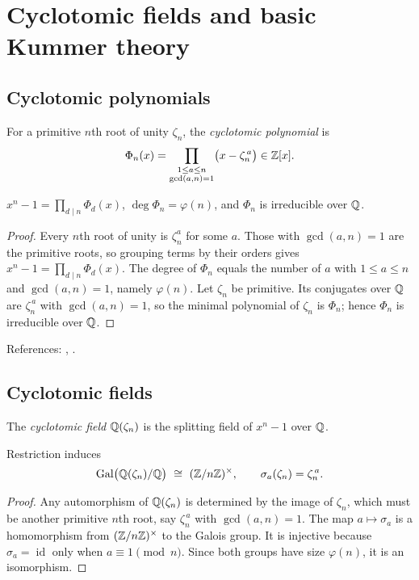 \section{Cyclotomic fields and basic Kummer theory}\label{sec:cyclotomic-kummer}

\subsection{Cyclotomic polynomials}
\begin{definition}
For a primitive $n$th root of unity $\zeta_n$, the \emph{cyclotomic polynomial} is
\[
\Phi_n(x)=\prod_{\substack{1\le a\le n\\ \gcd(a,n)=1}}\bigl(x-\zeta_n^{\,a}\bigr)\in\mathbb{Z}[x].
\]
\end{definition}
\begin{theorem}
$x^n-1=\prod_{d\mid n}\Phi_d(x)$, $\deg\Phi_n=\varphi(n)$, and $\Phi_n$ is irreducible over $\mathbb{Q}$.
\end{theorem}
\begin{proof}
Every $n$th root of unity is $\zeta_n^a$ for some $a$.
Those with $\gcd(a,n)=1$ are the primitive roots, so grouping terms by
their orders gives $x^n-1=\prod_{d\mid n}\Phi_d(x)$.
The degree of $\Phi_n$ equals the number of $a$ with $1\le a\le n$ and
$\gcd(a,n)=1$, namely $\varphi(n)$.
Let $\zeta_n$ be primitive.
Its conjugates over $\mathbb{Q}$ are $\zeta_n^{\,a}$ with $\gcd(a,n)=1$, so the
minimal polynomial of $\zeta_n$ is $\Phi_n$; hence $\Phi_n$ is
irreducible over $\mathbb{Q}$.
\end{proof}
References: \cite[\S13]{DF}, \cite[Ch.~VIII]{Lang}.

\subsection{Cyclotomic fields}
\begin{definition}
The \emph{cyclotomic field} $\mathbb{Q}(\zeta_n)$ is the splitting field of $x^n-1$ over $\mathbb{Q}$.
\end{definition}
\begin{theorem}
Restriction induces
\[
\Gal\bigl(\Q(\zeta_n)/\Q\bigr)\ \cong\ (\Z/n\Z)^\times,\qquad \sigma_a(\zeta_n)=\zeta_n^{\,a}.
\]
\end{theorem}
\begin{proof}
Any automorphism of $\mathbb{Q}(\zeta_n)$ is determined by the image of
$\zeta_n$, which must be another primitive $n$th root, say
$\zeta_n^{\,a}$ with $\gcd(a,n)=1$.
The map $a\mapsto\sigma_a$ is a homomorphism from
$(\mathbb{Z}/n\mathbb{Z})^\times$ to the Galois group.
It is injective because $\sigma_a=\operatorname{id}$ only when
$a\equiv1\pmod n$.
Since both groups have size $\varphi(n)$, it is an isomorphism.
\end{proof}

